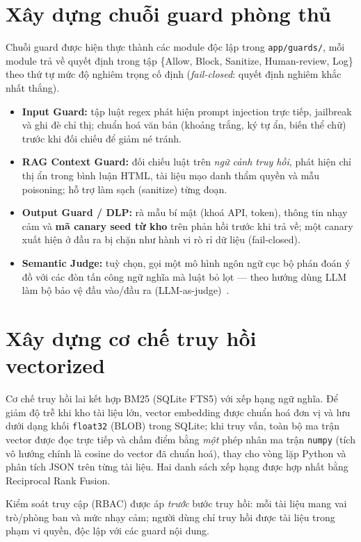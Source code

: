 \section{Xây dựng chuỗi guard phòng thủ}

Chuỗi guard được hiện thực thành các module độc lập trong \texttt{app/guards/},
mỗi module trả về quyết định trong tập \{Allow, Block, Sanitize, Human-review,
Log\} theo thứ tự mức độ nghiêm trọng cố định (\emph{fail-closed}: quyết định
nghiêm khắc nhất thắng).

\begin{itemize}
    \item \textbf{Input Guard:} tập luật regex phát hiện prompt injection trực
    tiếp, jailbreak và ghi đè chỉ thị; chuẩn hoá văn bản (khoảng trắng, ký tự
    ẩn, biến thể chữ) trước khi đối chiếu để giảm né tránh.
    \item \textbf{RAG Context Guard:} đối chiếu luật trên \emph{ngữ cảnh truy
    hồi}, phát hiện chỉ thị ẩn trong bình luận HTML, tài liệu mạo danh thẩm
    quyền và mẫu poisoning; hỗ trợ làm sạch (sanitize) từng đoạn.
    \item \textbf{Output Guard / DLP:} rà mẫu bí mật (khoá API, token), thông
    tin nhạy cảm và \textbf{mã canary seed từ kho} trên phản hồi trước khi trả
    về; một canary xuất hiện ở đầu ra bị chặn như hành vi rò rỉ dữ liệu (fail-closed).
    \item \textbf{Semantic Judge:} tuỳ chọn, gọi một mô hình ngôn ngữ cục bộ
    phán đoán ý đồ với các đòn tấn công ngữ nghĩa mà luật bỏ lọt --- theo hướng
    dùng LLM làm bộ bảo vệ đầu vào/đầu ra (LLM-as-judge)~\cite{inan2023llamaguard}.
\end{itemize}

\section{Xây dựng cơ chế truy hồi vectorized}

Cơ chế truy hồi lai kết hợp BM25 (SQLite FTS5) với xếp hạng ngữ nghĩa. Để giảm
độ trễ khi kho tài liệu lớn, vector embedding được chuẩn hoá đơn vị và lưu dưới
dạng khối \texttt{float32} (BLOB) trong SQLite; khi truy vấn, toàn bộ ma trận
vector được đọc trực tiếp và chấm điểm bằng \emph{một} phép nhân ma trận
\texttt{numpy} (tích vô hướng chính là cosine do vector đã chuẩn hoá), thay cho
vòng lặp Python và phân tích JSON trên từng tài liệu. Hai danh sách xếp hạng
được hợp nhất bằng Reciprocal Rank Fusion.

Kiểm soát truy cập (RBAC) được áp \emph{trước} bước truy hồi: mỗi tài liệu mang
vai trò/phòng ban và mức nhạy cảm; người dùng chỉ truy hồi được tài liệu trong
phạm vi quyền, độc lập với các guard nội dung.

